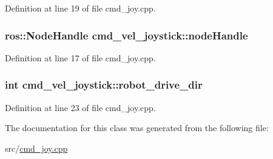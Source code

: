 Definition at line 19 of file cmd\-\_\-joy.\-cpp.

\hypertarget{classcmd__vel__joystick_ae50ce40991b7bfff45a21adbfc028465}{
\subsubsection[{node\-Handle}]{\setlength{\rightskip}{0pt plus 5cm}ros\-::\-Node\-Handle cmd\-\_\-vel\-\_\-joystick\-::node\-Handle\hspace{0.3cm}{\ttfamily [private]}}}\label{classcmd__vel__joystick_ae50ce40991b7bfff45a21adbfc028465}


Definition at line 17 of file cmd\-\_\-joy.\-cpp.

\hypertarget{classcmd__vel__joystick_a24f26021bde377287c5790dc5f734cc5}{
\subsubsection[{robot\-\_\-drive\-\_\-dir}]{\setlength{\rightskip}{0pt plus 5cm}int cmd\-\_\-vel\-\_\-joystick\-::robot\-\_\-drive\-\_\-dir\hspace{0.3cm}{\ttfamily [private]}}}\label{classcmd__vel__joystick_a24f26021bde377287c5790dc5f734cc5}


Definition at line 23 of file cmd\-\_\-joy.\-cpp.



The documentation for this class was generated from the following file\-:\begin{DoxyCompactItemize}
\item 
src/\hyperlink{cmd__joy_8cpp}{cmd\-\_\-joy.\-cpp}\end{DoxyCompactItemize}
